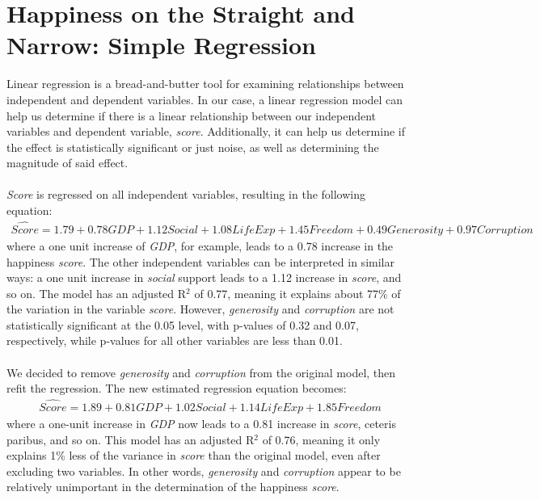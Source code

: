 \documentclass{article}
\begin{document}
\section{Happiness on the Straight and Narrow: Simple Regression}
Linear regression is a bread-and-butter tool for examining relationships between independent and dependent variables. In our case, a linear regression model can help us determine if there is a linear relationship between our independent variables and dependent variable, \textit{score}. Additionally, it can help us determine if the effect is statistically significant or just noise, as well as determining the magnitude of said effect.\\\\
\textit{Score} is regressed on all independent variables, resulting in the following equation:
\begin{align*} \hat{Score} = 1.79 + 0.78GDP + 1.12Social + 1.08LifeExp + 1.45Freedom + 0.49Generosity + 0.97Corruption \end{align*}
where a one unit increase of \textit{GDP}, for example, leads to a 0.78 increase in the happiness \textit{score}. The other independent variables can be interpreted in similar ways: a one unit increase in \textit{social} support leads to a 1.12 increase in \textit{score}, and so on. The model has an adjusted R$^2$ of 0.77, meaning it explains about 77\% of the variation in the variable \textit{score}. However, \textit{generosity} and \textit{corruption} are not statistically significant at the 0.05 level, with p-values of 0.32 and 0.07, respectively, while p-values for all other variables are less than 0.01.\\\\
We decided to remove \textit{generosity} and \textit{corruption} from the original model, then refit the regression. The new estimated regression equation becomes:
\begin{align*} \hat{Score} = 1.89 + 0.81GDP + 1.02Social + 1.14LifeExp + 1.85Freedom \end{align*}
where a one-unit increase in \textit{GDP} now leads to a 0.81 increase in \textit{score}, ceteris paribus, and so on. This model has an adjusted R$^2$ of 0.76, meaning it only explains 1\% less of the variance in \textit{score} than the original model, even after excluding two variables. In other words, \textit{generosity} and \textit{corruption} appear to be relatively unimportant in the determination of the happiness \textit{score}.\\\\
\end{document}
